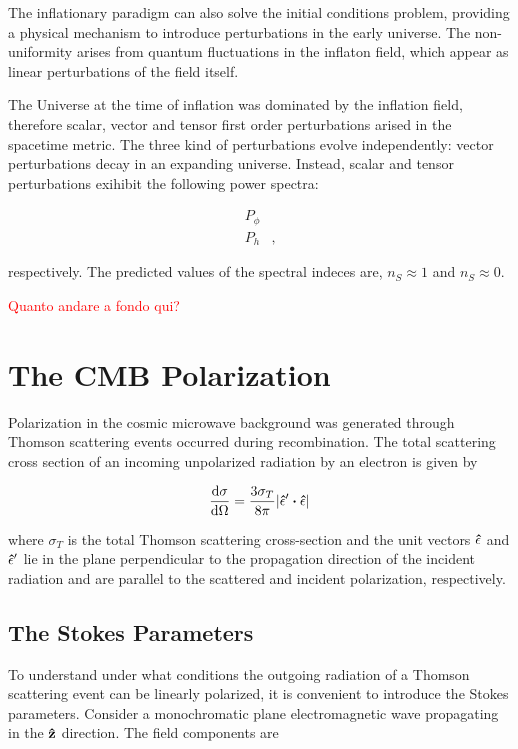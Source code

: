 The inflationary paradigm can also solve the initial conditions problem,
providing a physical mechanism to introduce perturbations in the early
universe. The non-uniformity arises from quantum fluctuations in the
inflaton field, which appear as linear perturbations of the field itself.

The Universe at the time of inflation was dominated by the inflation field,
therefore scalar, vector and tensor first order perturbations arised in
the spacetime metric. The three kind of perturbations evolve independently:
vector perturbations decay in an expanding universe. Instead, scalar and
tensor perturbations exihibit the following power spectra:

\begin{align}
        P_\phi & \\
        P_h & ,
\end{align}

respectively. The predicted values of the spectral
indeces are, $n_S \approx 1$ and $n_S \approx 0$.

\textcolor{red}{Quanto andare a fondo qui?}

\section{The CMB Polarization}

Polarization in the cosmic microwave background was generated through
Thomson scattering events occurred during recombination. The total
scattering cross section of an incoming unpolarized radiation by an
electron is given by

\begin{equation}
        \dv{\sigma}{\Omega} = \frac{3\sigma_T}{8\pi}
        \abs{\vectorunit{\epsilon}' \vdot \vectorunit{\epsilon}}
        \label{eq:thomson_csection}
\end{equation}

where $\sigma_T$ is the total Thomson scattering cross-section and the unit
vectors $\vectorunit{\epsilon}$ and $\vectorunit{\epsilon}'$ lie in the
plane perpendicular to the propagation direction of the incident radiation
and are parallel to the scattered and incident polarization, respectively.

\subsection{The Stokes Parameters}

To understand under what conditions the outgoing radiation of a Thomson
scattering event can be linearly polarized, it is convenient to introduce the
Stokes parameters. Consider a monochromatic plane electromagnetic wave
propagating in the $\vectorunit{z}$ direction. The field components are

